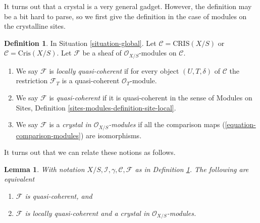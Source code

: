 \documentclass{stacks-project}
\theoremstyle{plain}
\newtheorem{lemma}[subsection]{Lemma}
\theoremstyle{definition}
\newtheorem{definition}[subsection]{Definition}
\theoremstyle{remark}
\numberwithin{equation}{subsection}
\begin{document}
\noindent
It turns out that a crystal is a very general gadget. However, the
definition may be a bit hard to parse, so we first give the definition
in the case of modules on the crystalline sites.

\begin{definition}
\label{definition-modules}
In Situation \ref{situation-global}.
Let $\mathcal{C} = \text{CRIS}(X/S)$ or $\mathcal{C} = \text{Cris}(X/S)$.
Let $\mathcal{F}$ be a sheaf of $\mathcal{O}_{X/S}$-modules on $\mathcal{C}$.
\begin{enumerate}
\item We say $\mathcal{F}$ is {\it locally quasi-coherent} if for every
object $(U, T, \delta)$ of $\mathcal{C}$ the restriction $\mathcal{F}_T$
is a quasi-coherent $\mathcal{O}_T$-module.
\item We say $\mathcal{F}$ is {\it quasi-coherent} if it is quasi-coherent
in the sense of
Modules on Sites, Definition \ref{sites-modules-definition-site-local}.
\item We say $\mathcal{F}$ is a {\it crystal in $\mathcal{O}_{X/S}$-modules}
if all the comparison maps (\ref{equation-comparison-modules}) are
isomorphisms.
\end{enumerate}
\end{definition}

\noindent
It turns out that we can relate these notions as follows.

\begin{lemma}
\label{lemma-crystal-quasi-coherent-modules}
With notation $X/S, \mathcal{I}, \gamma, \mathcal{C}, \mathcal{F}$
as in Definition \ref{definition-modules}. The following are equivalent
\begin{enumerate}
\item $\mathcal{F}$ is quasi-coherent, and
\item $\mathcal{F}$ is locally quasi-coherent and a crystal in
$\mathcal{O}_{X/S}$-modules.
\end{enumerate}
\end{lemma}
\end{document}
